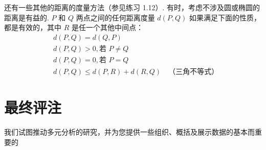 还有一些其他的距离的度量方法（参见练习 1.12）. 有时，考虑不涉及圆或椭圆的距离是有益的. $P$ 和 $Q$ 两点之间的任何距离度量 $d(P, Q)$ 如果满足下面的性质，都是有效的，其中 $R$ 是任一个其他中间点：
\label{eq:1-25}
\begin{equation}
\begin{aligned}
&d(P, Q) = d(Q, P) \\
&d(P, Q) > 0, \text{若 } P \neq Q \\
&d(P, Q) = 0, \text{若 } P = Q \\
&d(P, Q) \leqslant d(P, R) + d(R, Q) \quad \text{（三角不等式）}
\end{aligned} \tag{1-25}
\end{equation}

\section{最终评注}  %
\label{sec:1.6}

我们试图推动多元分析的研究，并为您提供一些组织、概括及展示数据的基本而重要的
